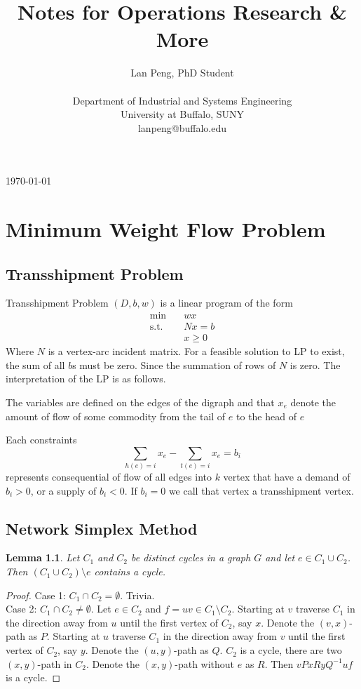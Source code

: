 \documentclass[10pt, twocolumn]{book}
\author{Lan Peng, PhD Student\\ \\Department of Industrial and Systems Engineering\\University at Buffalo, SUNY\\lanpeng@buffalo.edu}
\title{Notes for Operations Research \& More}
\theoremstyle{definition}
\theoremstyle{plain}
\newtheorem{lemma}[theorem]{Lemma}
\theoremstyle{remark}
\begin{document}
	\maketitle
	\today
	\tableofcontents

	\chapter{Minimum Weight Flow Problem}
		\section{Transshipment Problem}
			Transshipment Problem $(D, b, w)$ is a linear program of the form
			\begin{align}
				\min \quad & wx\\
				\text{s.t.} \quad & Nx = b\\
								  & x \ge 0
			\end{align}
			Where $N$ is a vertex-arc incident matrix. For a feasible solution to LP to exist, the sum of all $b$s must be zero. Since the summation of rows of $N$ is zero. The interpretation of the LP is as follows.

			The variables are defined on the edges of the digraph and that $x_e$ denote the amount of flow of some commodity from the tail of $e$ to the head of $e$

			Each constraints
			\begin{equation}
				\sum_{h(e) = i} x_e - \sum_{t(e) = i}x_e = b_i
			\end{equation}
			represents consequential of flow of all edges into $k$ vertex that have a demand of $b_i > 0$, or a supply of $b_i < 0$. If $b_i = 0$ we call that vertex a transshipment vertex.

		\section{Network Simplex Method}
			\begin{lemma}
				Let $C_1$ and $C_2$ be distinct cycles in a graph $G$ and let $e\in C_1 \cup C_2$. Then $(C_1 \cup C_2) \setminus e$ contains a cycle.
			\end{lemma}

			\begin{proof}
				Case 1: $C_1 \cap C_2 = \emptyset$. Trivia.\\
				Case 2: $C_1 \cap C_2 \neq \emptyset$. Let $e\in C_2$ and $f=uv \in C_1 \setminus C_2$. Starting at $v$ traverse $C_1$ in the direction away from $u$ until the first vertex of $C_2$, say $x$. Denote the $(v, x)$-path as $P$. Starting at $u$ traverse $C_1$ in the direction away from $v$ until the first vertex of $C_2$, say $y$. Denote the $(u, y)$-path as $Q$. $C_2$ is a cycle, there are two $(x, y)$-path in $C_2$. Denote the $(x, y)$-path without $e$ as $R$. Then $vPxRyQ^{-1}uf$ is a cycle.
			\end{proof}
\end{document}
